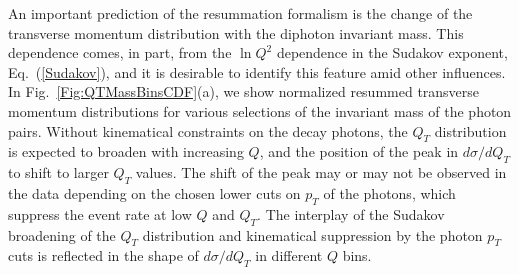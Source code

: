 \documentclass[12pt,english,aps,preprint,prd,letterpaper,fleqn,nofootinbib,showpacs,showkeys,tightenlines,floatfix]{revtex4}
\begin{document}
An important prediction of the resummation formalism is the change
of the transverse momentum distribution with the diphoton invariant
mass. This dependence comes, in part, from the $\ln Q^{2}$ dependence
in the Sudakov exponent, Eq.~(\ref{Sudakov}), and it is desirable
to identify this feature amid other influences. In Fig.~\ref{Fig:QTMassBinsCDF}(a),
we show normalized resummed transverse momentum distributions for
various selections of the invariant mass of the photon pairs. Without
kinematical constraints on the decay photons, the
$Q_{T}$ distribution is expected to broaden with increasing $Q$, and
the position of the peak in $d\sigma/dQ_T$ to shift to larger $Q_T$
values. The shift of the peak may or may not be observed in the data
depending on the chosen lower cuts on $p_T$ of the photons, which
suppress the event rate at low $Q$ and $Q_T$. The interplay of the
Sudakov 
broadening of the $Q_T$ distribution and kinematical suppression by
the photon $p_T$ cuts is reflected in the shape of $d\sigma/dQ_{T}$
in different $Q$ bins.
\end{document}
